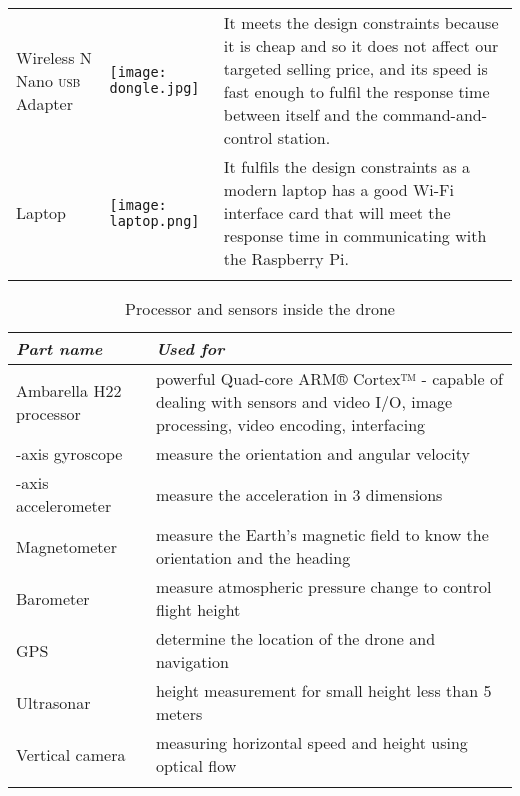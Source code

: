 \documentclass[../main.tex]{subfiles}
\begin{document}
\begin{table}[p]
\begin{tabular}{ p{4cm} p{3cm} p{6cm} }
		Wireless N Nano \textsc{usb} Adapter  
		& \begin{minipage}{.1\textwidth}
			\texttt{[image: dongle.jpg]}
		\end{minipage} 
                & It meets the design constraints because it is cheap
                and so it does not affect our targeted selling price,
                and its speed is fast enough to fulfil the response time
                between itself and the command-and-control station.  \\ 
		\addlinespace
		
		Laptop 
		& \begin{minipage}{.1\textwidth}
			\texttt{[image: laptop.png]}
		\end{minipage} 
                & It fulfils the design constraints as a modern laptop
                has a good Wi-Fi interface card that will meet the
                response time in communicating with the Raspberry Pi.
                \\ 
		\addlinespace
		
		\bottomrule
	\end{tabular}
\end{table}

\begin{table}[tbp]
	\centering
	\caption{Processor and sensors inside the drone}
	\label{tab:sensors-table}  
	\begin{tabular}{ p{4cm} p{8cm} }
		\toprule
		\textit{Part name} 
		& \textit{Used for}  \\ 
		
		\midrule
		\raggedright Ambarella H22 
		processor
		& powerful Quad-core ARM® Cortex™ - capable of dealing with sensors and video I/O, 
		image processing, video encoding, interfacing \\ 
                \addlinespace
		3-axis gyroscope
		& measure the orientation and angular velocity  \\ 
                \addlinespace
		3-axis accelerometer
		& measure the acceleration in 3 dimensions  \\ 
                \addlinespace
		Magnetometer 
		& measure the Earth's magnetic field to know the orientation and the heading   \\ 
                \addlinespace
				Barometer 
		& measure atmospheric pressure change to control flight height   \\ 
                \addlinespace
				GPS 
		& determine the location of the drone and navigation  \\ 
                \addlinespace
				Ultrasonar 
		&  height measurement for small height less than 5 meters  \\ 
                \addlinespace
				Vertical camera 
		&  measuring horizontal speed and height using optical flow \\ 
                \addlinespace
        \bottomrule
    \end{tabular}
\end{table}   
\end{document}
